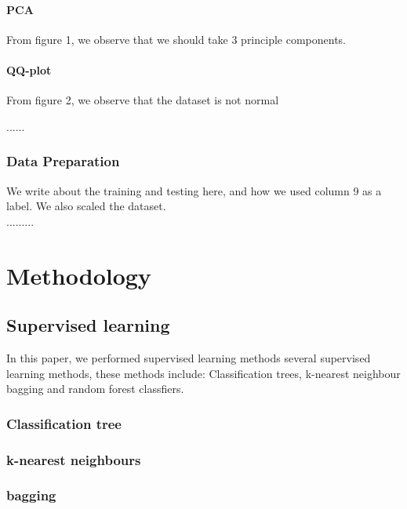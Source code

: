 \documentclass[12pt]{article}
\begin{document}
\paragraph{PCA}

From figure 1, we observe that we should take 3 principle components.



\paragraph{QQ-plot}

From figure 2, we observe that the dataset is not normal


...... 
\subsubsection{Data Preparation} 

We write about the training and testing here, and how we used column 9 as a label. We also scaled the dataset.\\

.........
\section{Methodology}
\subsection{Supervised learning} 
 In this paper, we performed supervised learning methods several supervised learning methods, these methods include: Classification trees, k-nearest neighbour bagging and random forest classfiers.\cite{zhou2012ensemble}
 \subsubsection{Classification tree}

 \subsubsection{k-nearest neighbours}

 \subsubsection{bagging}
\end{document}
